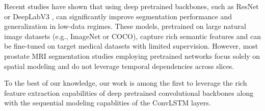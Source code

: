 \documentclass[journal]{IEEEtran}
\begin{document}
Recent studies have shown that using deep pretrained backbones, such as ResNet or DeepLabV3 \cite{chen2017rethinking}, can significantly improve segmentation performance and generalization in low-data regimes. These models, pretrained on large natural image datasets (e.g., ImageNet or COCO), capture rich semantic features and can be fine-tuned on target medical datasets with limited supervision. However, most prostate MRI segmentation studies employing pretrained networks focus solely on spatial modeling and do not leverage temporal dependencies across slices. 

To the best of our knowledge, our work is among the first to leverage the rich feature extraction capabilities of deep pretrained convolutional backbones along with the sequential modeling capablities of the ConvLSTM layers.   






\end{document}
